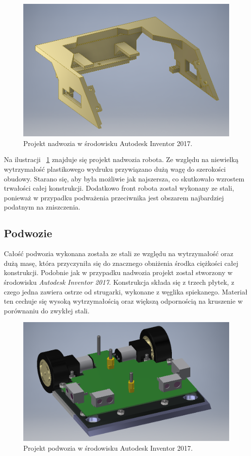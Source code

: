 \begin{figure}[H]
	\centering
		\includegraphics[width=0.75\linewidth]{pic04/body.png}
	\caption{Projekt nadwozia w środowisku Autodesk Inventor 2017.}
	\label{fig:body}	
\end{figure}

Na ilustracji ~\ref{fig:body} znajduje się projekt nadwozia robota. Ze względu na niewielką wytrzymałość plastikowego wydruku przywiązano dużą wagę do szerokości obudowy. Starano się, aby była możliwie jak najszersza, co skutkowało wzrostem trwałości całej konstrukcji. Dodatkowo front robota został wykonany ze stali, ponieważ w przypadku podważenia przeciwnika jest obszarem najbardziej podatnym na zniszczenia. 

\subsection{Podwozie}
Całość podwozia wykonana została ze stali ze względu na wytrzymałość oraz dużą masę, która przyczyniła się do znacznego obniżenia środka ciężkości całej konstrukcji.  Podobnie jak w przypadku nadwozia projekt został stworzony w środowisku \textit{Autodesk Inventor 2017}. Konstrukcja składa się z trzech płytek, z czego jedna zawiera ostrze od strugarki, wykonane z węglika spiekanego. Materiał ten cechuje się wysoką wytrzymałością oraz większą odpornością na kruszenie w porównaniu do zwykłej stali. 

\begin{figure}[H]
	\centering
		\includegraphics[width=0.75\linewidth]{pic04/chassis.png}
	\caption{Projekt podwozia w środowisku Autodesk Inventor 2017.}
	\label{fig:chassis}	
\end{figure}

